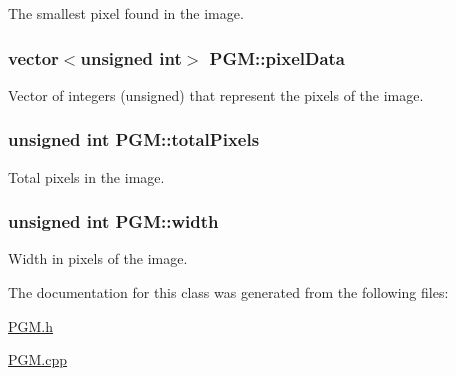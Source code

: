 The smallest pixel found in the image. 

\hypertarget{class_p_g_m_ab195067d405dd4dcb8071a10d98bd31d}{}
\subsubsection[{pixel\+Data}]{\setlength{\rightskip}{0pt plus 5cm}vector$<$unsigned int$>$ P\+G\+M\+::pixel\+Data\hspace{0.3cm}{\ttfamily [private]}}\label{class_p_g_m_ab195067d405dd4dcb8071a10d98bd31d}


Vector of integers (unsigned) that represent the pixels of the image. 

\hypertarget{class_p_g_m_a01641571253c5af3bced03f9199c2a29}{}
\subsubsection[{total\+Pixels}]{\setlength{\rightskip}{0pt plus 5cm}unsigned int P\+G\+M\+::total\+Pixels\hspace{0.3cm}{\ttfamily [private]}}\label{class_p_g_m_a01641571253c5af3bced03f9199c2a29}


Total pixels in the image. 

\hypertarget{class_p_g_m_ae1aba034876f972708f51869f9b96473}{}
\subsubsection[{width}]{\setlength{\rightskip}{0pt plus 5cm}unsigned int P\+G\+M\+::width\hspace{0.3cm}{\ttfamily [private]}}\label{class_p_g_m_ae1aba034876f972708f51869f9b96473}


Width in pixels of the image. 



The documentation for this class was generated from the following files\+:\begin{DoxyCompactItemize}
\item 
\hyperlink{_p_g_m_8h}{P\+G\+M.\+h}\item 
\hyperlink{_p_g_m_8cpp}{P\+G\+M.\+cpp}\end{DoxyCompactItemize}
